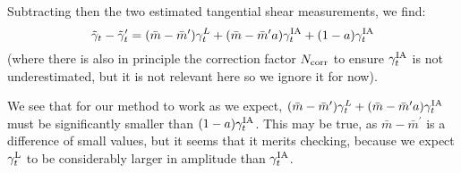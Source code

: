 \documentclass[onecolumn,amsmath,aps,fleqn, superscriptaddress]{revtex4}
\begin{document}
Subtracting then the two estimated tangential shear measurements, we find:
\begin{equation}
\tilde{\gamma}_t - \tilde{\gamma}_t^\prime = (\bar{m} - \bar{m}^\prime) \gamma_t^L + (\bar{m} - \bar{m}^\prime a) \gamma_t^{\rm IA} + (1-a) \gamma_t^{\rm IA}
\label{diff_w_mbars}
\end{equation}
(where there is also in principle the correction factor $N_{\rm corr}$ to ensure $\gamma_t^{\rm IA}$ is not underestimated, but it is not relevant here so we ignore it for now). 

We see that for our method to work as we expect, $(\bar{m} - \bar{m}^\prime) \gamma_t^L + (\bar{m} - \bar{m}^\prime a) \gamma_t^{\rm IA}$ must be significantly smaller than $(1-a) \gamma_t^{\rm IA}$. This may be true, as $\bar{m} - \bar{m}^\prime$ is a difference of small values, but it seems that it merits checking, because we expect $\gamma_t^{\rm L}$ to be considerably larger in amplitude than $\gamma_t^{\rm IA}$.














\end{document}
